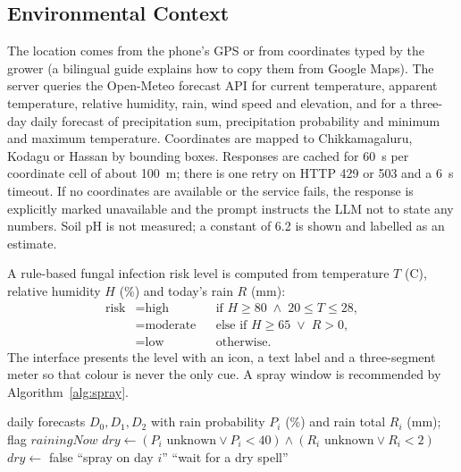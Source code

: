 \subsection{Environmental Context}
The location comes from the phone's GPS or from coordinates typed by the grower (a bilingual guide explains how to copy
them from Google Maps). The server queries the Open-Meteo forecast API for current temperature, apparent temperature,
relative humidity, rain, wind speed and elevation, and for a three-day daily forecast of precipitation sum, precipitation
probability and minimum and maximum temperature. Coordinates are mapped to Chikkamagaluru, Kodagu or Hassan by bounding
boxes. Responses are cached for 60~s per coordinate cell of about 100~m; there is one retry on HTTP 429 or 503 and a
6~s timeout. If no coordinates are available or the service fails, the response is explicitly marked unavailable and the
prompt instructs the LLM not to state any numbers. Soil pH is not measured; a constant of 6.2 is shown and labelled as an
estimate.

A rule-based fungal infection risk level is computed from temperature $T$ (\textdegree C), relative humidity $H$ (\%)
and today's rain $R$ (mm):
\begin{equation}
\begin{aligned}
\mathrm{risk} &= \text{high} && \text{if } H \ge 80 \;\land\; 20 \le T \le 28,\\
&= \text{moderate} && \text{else if } H \ge 65 \;\lor\; R > 0,\\
&= \text{low} && \text{otherwise}.
\end{aligned}
\end{equation}
The interface presents the level with an icon, a text label and a three-segment meter so that colour is never the only
cue. A spray window is recommended by Algorithm~\ref{alg:spray}.

\begin{algorithm}[t]
\caption{Three-day spray window}
\label{alg:spray}
\begin{algorithmic}[1]
\REQUIRE daily forecasts $D_0, D_1, D_2$ with rain probability $P_i$ (\%) and rain total $R_i$ (mm); flag $\mathit{rainingNow}$
  \STATE $\mathit{dry} \leftarrow (P_i \text{ unknown} \lor P_i < 40) \land (R_i \text{ unknown} \lor R_i < 2)$
   \STATE $\mathit{dry} \leftarrow$ false \ENDIF
   \RETURN ``spray on day $i$'' \ENDIF
\ENDFOR
\RETURN ``wait for a dry spell''
\end{algorithmic}
\end{algorithm}

